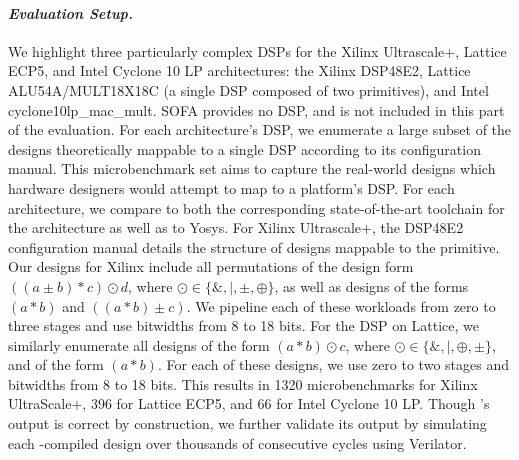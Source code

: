 \paragraph{\textnormal{\textit{\textbf{Evaluation Setup.}}}}

We highlight three particularly complex
  DSPs for the Xilinx Ultrascale+,
  Lattice ECP5,
  and Intel Cyclone 10 LP architectures: 
  the Xilinx DSP48E2,
  Lattice ALU54A/MULT18X18C 
  (a single DSP composed of 
  two primitives),
  and Intel cyclone10lp\_mac\_mult.
SOFA provides no DSP, and is not included
  in this part of the evaluation.
For each architecture's DSP,
  we enumerate a large subset 
  of the designs
  theoretically mappable
  to a single DSP 
  according to its
  configuration manual.
This microbenchmark set
  aims to capture
  the real-world designs
  which hardware designers
  would attempt to map
  to a platform's DSP.
For each architecture, we compare \lr
  to both the corresponding
  state-of-the-art toolchain for
  the architecture 
  as well as to Yosys.
For Xilinx Ultrascale+, 
  the DSP48E2 configuration manual details the
  structure of designs mappable
  to the primitive.
Our designs for Xilinx include 
  all permutations of the design form
  $((a \pm b) * c) \odot d$,
  where $\odot \in \{\&, |, \pm, \oplus \}$,
  as well as designs of the forms $(a * b)$ and $((a * b) \pm c)$.
We pipeline each of these
  workloads from zero to three stages 
  and use bitwidths from 8 to 18 bits.
For the DSP on Lattice, we similarly enumerate
  all designs of the form $(a * b) \odot c$, 
  where $\odot \in \{\&, |, \oplus, \pm\}$, and of the form $(a * b)$.
For each of these designs, 
  we use zero to two stages
  and bitwidths from 8 to 18 bits.
This results in
    1320 microbenchmarks for Xilinx UltraScale+,
    396 for Lattice ECP5,
    and 66 for Intel Cyclone 10 LP.
Though \lr's output is correct by construction,
  we further validate its output
  by simulating each \lr-compiled design
  over thousands of consecutive cycles
  using Verilator.\tighten
  
